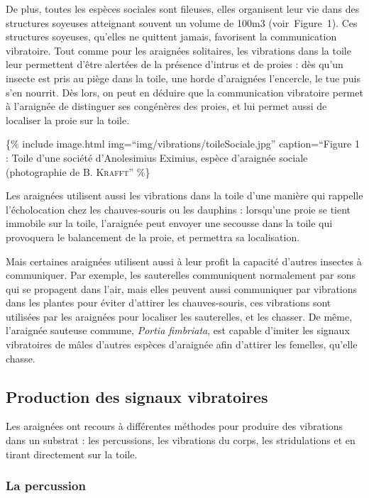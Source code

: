 De plus, toutes les espèces sociales sont fileuses, elles organisent
leur vie dans des structures soyeuses atteignant souvent un volume de
100m3 (voir~Figure~1). Ces structures soyeuses, qu'elles ne quittent
jamais, favorisent la communication vibratoire. Tout comme pour les
araignées solitaires, les vibrations dans la toile leur permettent
d'être alertées de la présence d'intrus et de proies : dès qu'un insecte
est pris au piège dans la toile, une horde d'araignées l'encercle, le
tue puis s'en nourrit. Dès lors, on peut en déduire que la communication
vibratoire permet à l'araignée de distinguer ses congénères des proies,
et lui permet aussi de localiser la proie sur la toile.

\{\% include image.html img=``img/vibrations/toileSociale.jpg''
caption=``Figure 1 : Toile d'une société d'Anolesimius Eximius, espèce
d'araignée sociale (photographie de B. \textsc{Krafft}'' \%\}

Les araignées utilisent aussi les vibrations dans la toile d'une manière
qui rappelle l'écholocation chez les chauves-souris ou les dauphins :
lorsqu'une proie se tient immobile sur la toile, l'araignée peut envoyer
une secousse dans la toile qui provoquera le balancement de la proie, et
permettra sa localisation.

Mais certaines araignées utilisent aussi à leur profit la capacité
d'autres insectes à communiquer. Par exemple, les sauterelles
communiquent normalement par sons qui se propagent dans l'air, mais
elles peuvent aussi communiquer par vibrations dans les plantes pour
éviter d'attirer les chauves-souris, ces vibrations sont utilisées par
les araignées pour localiser les sauterelles, et les chasser. De même,
l'araignée sauteuse commune, \emph{Portia fimbriata}, est capable
d'imiter les signaux vibratoires de mâles d'autres espèces d'araignée
afin d'attirer les femelles, qu'elle chasse.

\subsection{Production des signaux
vibratoires}\label{production-des-signaux-vibratoires}

Les araignées ont recours à différentes méthodes pour produire des
vibrations dans un substrat : les percussions, les vibrations du corps,
les stridulations et en tirant directement sur la toile.

\subsubsection{La percussion}\label{la-percussion}

